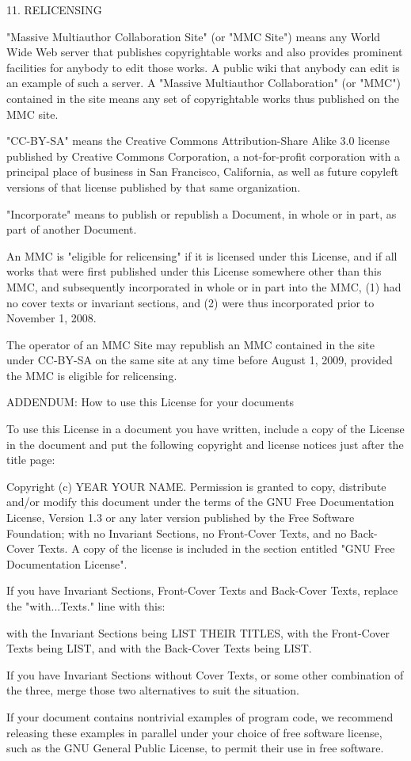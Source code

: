 \documentclass[11pt,a4paper]{article}
\begin{document}
\begin{scriptsize}
11. RELICENSING

"Massive Multiauthor Collaboration Site" (or "MMC Site") means any
World Wide Web server that publishes copyrightable works and also
provides prominent facilities for anybody to edit those works.  A
public wiki that anybody can edit is an example of such a server.  A
"Massive Multiauthor Collaboration" (or "MMC") contained in the site
means any set of copyrightable works thus published on the MMC site.

"CC-BY-SA" means the Creative Commons Attribution-Share Alike 3.0 
license published by Creative Commons Corporation, a not-for-profit 
corporation with a principal place of business in San Francisco, 
California, as well as future copyleft versions of that license 
published by that same organization.

"Incorporate" means to publish or republish a Document, in whole or in 
part, as part of another Document.

An MMC is "eligible for relicensing" if it is licensed under this 
License, and if all works that were first published under this License 
somewhere other than this MMC, and subsequently incorporated in whole or 
in part into the MMC, (1) had no cover texts or invariant sections, and 
(2) were thus incorporated prior to November 1, 2008.

The operator of an MMC Site may republish an MMC contained in the site
under CC-BY-SA on the same site at any time before August 1, 2009,
provided the MMC is eligible for relicensing.


ADDENDUM: How to use this License for your documents

To use this License in a document you have written, include a copy of
the License in the document and put the following copyright and
license notices just after the title page:

    Copyright (c)  YEAR  YOUR NAME.
    Permission is granted to copy, distribute and/or modify this document
    under the terms of the GNU Free Documentation License, Version 1.3
    or any later version published by the Free Software Foundation;
    with no Invariant Sections, no Front-Cover Texts, and no Back-Cover Texts.
    A copy of the license is included in the section entitled "GNU
    Free Documentation License".

If you have Invariant Sections, Front-Cover Texts and Back-Cover Texts,
replace the "with...Texts." line with this:

    with the Invariant Sections being LIST THEIR TITLES, with the
    Front-Cover Texts being LIST, and with the Back-Cover Texts being LIST.

If you have Invariant Sections without Cover Texts, or some other
combination of the three, merge those two alternatives to suit the
situation.

If your document contains nontrivial examples of program code, we
recommend releasing these examples in parallel under your choice of
free software license, such as the GNU General Public License,
to permit their use in free software.

\end{scriptsize}
\end{document}
